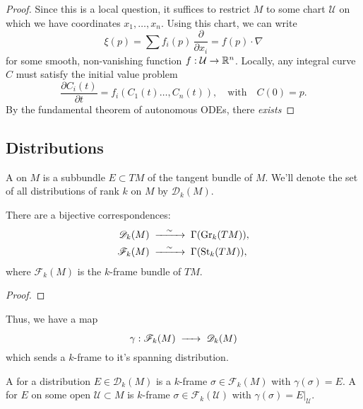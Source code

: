 \documentclass{lkx_paper}
\begin{document}
\begin{proof}
	Since this is a local question, it suffices to restrict $M$ to some chart $\mathcal{U}$ on which we have coordinates $x_1, \ldots, x_n$. Using this chart, we can write
	\[
		\xi(p) = \sum f_i(p)\,\frac{\partial}{\partial x_i} = f(p)\cdot \nabla
	\]
	for some smooth, non-vanishing function $f : \mathcal{U} \to \mathbb{R}^n$. Locally, any integral curve $C$ must satisfy the initial value problem
	\[
		\frac{\partial C_i(t)}{\partial t} = f_i(C_1(t) \ldots, C_n(t)),\quad\textrm{with}\quad C(0) = p.
	\]
	By the fundamental theorem of autonomous ODEs, there \emph{exists }
\end{proof}

\subsection{Distributions}

\begin{definition}
	A  on $M$ is a subbundle $E\subset TM$ of the tangent bundle of $M$. We'll denote the set of all distributions of rank $k$ on $M$ by $\mathscr{D}_k(M)$.
\end{definition}

\begin{proposition}
	There are a bijective correspondences:
	\[
		\begin{aligned}
			\mathscr{D}_k(M) & \longisom \Gamma(\Gr_k(TM)), \\
			\mathscr{F}_k(M) & \longisom \Gamma(\St_k(TM)), \\
		\end{aligned}
	\]
	where $\mathscr{F}_k(M)$ is the $k$-frame bundle of $TM$.
\end{proposition}

\begin{proof}
\end{proof}

Thus, we have a map
\[
	\gamma : \mathscr{F}_k(M) \longto \mathscr{D}_k(M)
\]
which sends a $k$-frame to it's spanning distribution.

\begin{definition}
	A  for a distribution $E\in \mathscr{D}_k(M)$ is a $k$-frame $\sigma\in \mathscr{F}_k(M)$ with $\gamma(\sigma)=E$. A  for $E$ on some open $\mathcal{U}\subset M$ is $k$-frame $\sigma\in \mathscr{F}_k(\mathcal{U})$ with $\gamma(\sigma)=E|_\mathcal{U}$.
\end{definition}
\end{document}
